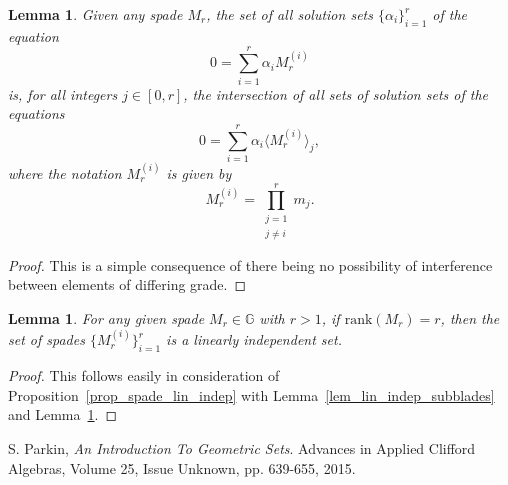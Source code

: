 \documentclass{birkjour}
\newtheorem{lem}[thm]{Lemma}
\theoremstyle{definition}
\theoremstyle{remark}
\numberwithin{equation}{section}
\newcommand{\G}{\mathbb{G}}
\newcommand{\rank}{\mbox{rank}}
\begin{document}
\begin{lem}\label{lem_solution_intersection}
Given any spade $M_r$, the set of all solution sets $\{\alpha_i\}_{i=1}^r$ of the equation
\begin{equation*}
0 = \sum_{i=1}^r\alpha_i M_r^{(i)}
\end{equation*}
is, for all integers $j\in[0,r]$, the intersection of all sets of solution sets of the equations
\begin{equation*}
0 = \sum_{i=1}^r\alpha_i\langle M_r^{(i)}\rangle_j,
\end{equation*}
where the notation $M_r^{(i)}$ is given by
\begin{equation*}
M_r^{(i)}=\prod_{\substack{j=1\\j\neq i}}^r m_j.
\end{equation*}
\end{lem}
\begin{proof}
This is a simple consequence of there being no possibility of interference between elements of differing grade.
\end{proof}

\begin{lem}
For any given spade $M_r\in\G$ with $r>1$, if $\rank(M_r)=r$, then
the set of spades $\{M_r^{(i)}\}_{i=1}^r$ is a linearly independent set.
\end{lem}
\begin{proof}
This follows easily in consideration of Proposition~\ref{prop_spade_lin_indep} with Lemma~\ref{lem_lin_indep_subblades} and Lemma~\ref{lem_solution_intersection}.
\end{proof}


\begin{thebibliography}{9}

S. Parkin,
\emph{An Introduction To Geometric Sets}.
Advances in Applied Clifford Algebras, Volume 25, Issue Unknown, pp. 639-655, 2015.


\end{thebibliography}
\end{document}
